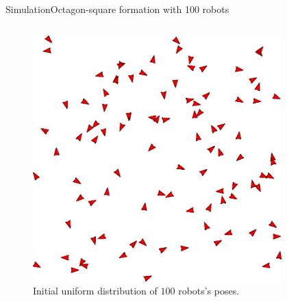 \documentclass[10pt]{beamer}
\begin{document}
\begin{frame}{Simulation}{Octagon-square formation with 100 robots}
  \begin{block}{}
    \begin{columns}[T] %
      \begin{column}{.5\textwidth}
         \begin{figure}
          \centering
            \includegraphics[scale=0.45]{figs/initial-formation}
            \caption{Initial uniform distribution of $100$ robots's
             poses.}
          \end{figure}
          \begin{center}
          \end{center}
      \end{column}%
      \begin{column}{.5\textwidth}   
        \begin{figure}
          \centering

\end{figure}
\end{column}
\end{columns}
\end{block}
\end{frame}
\end{document}
